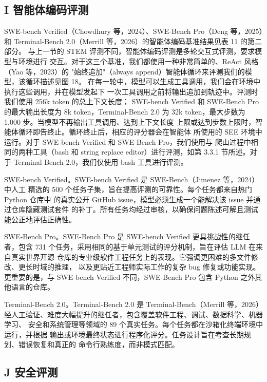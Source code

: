 \subsection{I 智能体编码评测}\label{i-agentic-coding-evaluations}

SWE-bench Verified（Chowdhury 等，2024）、SWE-Bench Pro（Deng 等，2025）和
Terminal-Bench 2.0（Merrill 等，2026）的智能体编码基准结果见表 11 的第二部分。
与上一节的 STEM 评测不同，智能体编码评测是多轮交互式评测，要求模型与环境进行
交互。对于这三个基准，我们都使用一种非常简单的、ReAct 风格（Yao 等，2023）的
"始终追加"（always append）智能体循环来评测我们的模型，该循环描述见图 18。
在每一轮中，模型可以生成工具调用，我们会在环境中执行这些调用，并在模型发起下
一次工具调用之前将输出追加到轨迹中。评测时我们使用 256k token 的总上下文长度；
SWE-bench Verified 和 SWE-Bench Pro 的最大输出长度为 8k token，Terminal-Bench
2.0 为 32k token，最大步数为 1,000 步。当模型不再输出工具调用、达到上下文长度
上限或达到步数上限时，智能体循环即告终止。循环终止后，相应的评分器会在智能体
所使用的 SEE 环境中运行。对于 SWE-bench Verified 和 SWE-Bench Pro，我们使用与
爬山过程中相同的两种工具（bash 和 string replace editor）进行评测，如第 3.3.1
节所述。对于 Terminal-Bench 2.0，我们仅使用 bash 工具进行评测。

SWE-bench Verified。SWE-bench Verified 是 SWE-Bench（Jimenez 等，2024）中人工
精选的 500 个任务子集，旨在提高评测的可靠性。每个任务都来自热门 Python 仓库中
的真实公开 GitHub issue，模型必须生成一个能解决该 issue 并通过仓库隐藏测试套件
的补丁。所有任务均经过审核，以确保问题陈述可解且测试能公正地评估正确性。

SWE-Bench Pro。SWE-Bench Pro 是 SWE-bench Verified 更具挑战性的继任者，包含
731 个任务，采用相同的基于单元测试的评分机制，旨在评估 LLM 在来自真实世界开源
仓库的专业级软件工程任务上的表现。它强调更困难的多文件修改、更长时域的推理，
以及更贴近工程师实际工作的复杂 bug 修复或功能实现。更重要的是，与 SWE-bench
Verified 不同，SWE-Bench Pro 包含 Python 之外其他语言的仓库。

Terminal-Bench 2.0。Terminal-Bench 2.0 是 Terminal-Bench（Merrill 等，2026）
经人工验证、难度大幅提升的继任者，包含覆盖软件工程、调试、数据科学、机器学习、
安全和系统管理等领域的 89 个真实任务。每个任务都在沙箱化终端环境中运行，并根据
输出或环境最终状态进行程序化评分。任务设计旨在考查长期规划、错误恢复和真正的
命令行熟练度，而非模式匹配。

\subsection{J 安全评测}\label{j-safety-evaluations}

